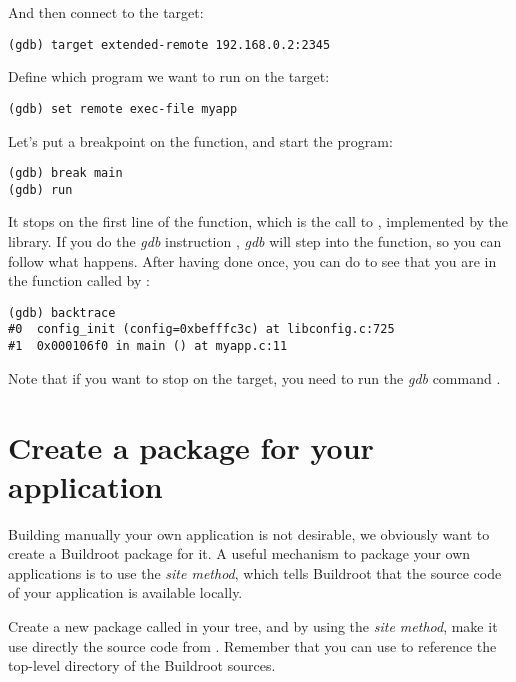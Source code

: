 And then connect to the target:

\begin{verbatim}
(gdb) target extended-remote 192.168.0.2:2345
\end{verbatim}

Define which program we want to run on the target:

\begin{verbatim}
(gdb) set remote exec-file myapp
\end{verbatim}

Let's put a breakpoint on the  function, and start the
program:

\begin{verbatim}
(gdb) break main
(gdb) run
\end{verbatim}

It stops on the first line of the  function, which is the
call to , implemented by the 
library. If you do the {\em gdb} instruction , {\em gdb}
will step into the function, so you can follow what happens. After
having done  once, you can do  to see that
you are in the function  called by :

\begin{verbatim}
(gdb) backtrace
#0  config_init (config=0xbefffc3c) at libconfig.c:725
#1  0x000106f0 in main () at myapp.c:11
\end{verbatim}

Note that if you want  to stop on the target, you need
to run the {\em gdb} command .

\section{Create a package for your application}

Building manually your own application is not desirable, we obviously
want to create a Buildroot package for it. A useful mechanism to
package your own applications is to use the
 {\em site method}, which tells Buildroot that the source
code of your application is available locally.

Create a new package called  in your 
tree, and by using the  {\em site method}, make it use
directly the  source code from
. Remember that you can use 
to reference the top-level directory of the Buildroot sources.

